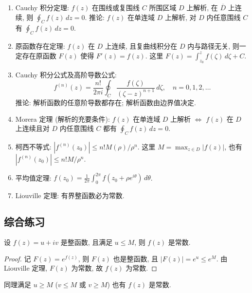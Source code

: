 \documentclass[theorem=false,mathfont=none,openany,sub3section]{easybook}
\begin{document}
\begin{enumerate}
  \item Cauchy 积分定理: $f(z)$ 在围线或复围线 $C$ 所围区域 $D$ 上解析, 在 $\overline{D}$ 上连续, 则 $\oint_{C}f(z)\,dz=0$.
  推论: $f(z)$ 在单连域 $D$ 上解析, 对 $D$ 内任意围线 $C$ 有 $\oint_{C}f(z)\,dz=0$.
  \item 原函数存在定理: $f(z)$ 在 $D$ 上连续, 且复曲线积分在 $D$ 内与路径无关, 则一定存在原函数 $F(z)$ 使得 $F'(z)=f(z)$. 这里 $F(z)=\int_{z_{0}}^{z}f(\zeta)\,d\zeta+C$.
  \item Cauchy 积分公式及高阶导数公式:
  \[
  f^{(n)}(z)=\frac{n!}{2\pi i}\oint_C\frac{f(\zeta)}{(\zeta-z)^{n+1}}\,d\zeta,
  \quad n=0,1,2,\ldots
  \]
  推论: 解析函数的任意阶导数都存在; 解析函数由边界值决定.
  \item Morera 定理 (解析的充要条件): $f(z)$ 在单连域 $D$ 上解析 $\Leftrightarrow$ $f(z)$ 在 $D$ 上连续且对 $D$ 内任意围线 $C$ 都有 $\oint_{C}f(z)\,dz=0$.
  \item 柯西不等式: $|f^{(n)}(z_{0})|\leq n!M(\rho)/\rho^{n}$.
  这里 $M=\max_{z\in D}|f(z)|$, 也有 $|f^{(n)}(z_{0})|\leq n!M/\rho^{n}$.
  \item 平均值定理: $f(z_{0})=\frac{1}{2\pi}\int_{0}^{2\pi}f(z_{0}+\rho e^{i\theta})\,d\theta$.
  \item Liouville 定理: 有界整函数必为常数.
\end{enumerate}

\subsection{综合练习}

\begin{example}
  设 $f(z)=u+iv$ 是整函数, 且满足 $u\leq M$, 则 $f(z)$ 是常数.\par
  \begin{proof}
    记 $F(z)=e^{f(z)}$, 则 $F(z)$ 也是整函数, 且 $|F(z)|=e^{u}\leq e^{M}$. 由 Liouville 定理, $F(z)$ 为常数, 故 $f(z)$ 为常数.
  \end{proof}
  同理满足 $u\geq M$ ($v\leq M$ 或 $v\geq M$) 也有 $f(z)$ 是常数.
\end{example}
\end{document}
